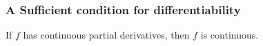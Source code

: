 



 \begin{frame}[fragile] \frametitle{A Sufficient condition for  differentiability}

\begin{corollary}
If $f$  has continuous partial derivatives, then $f$ is continuous.
\end{corollary}

\end{frame}







